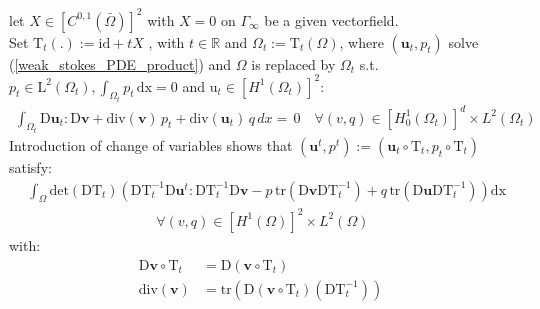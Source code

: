 \begin{theorem*}
let $X \in [C^{0,1}(\bar{\Omega})]^2$ with $X = 0$ on $\Gamma_{\infty}$ be a given vectorfield. \\
Set $\mathrm{T}_t(.) := \mathrm{id} + tX $ , with $t \in \mathbb{R}$ and $\Omega_t := \mathrm{T}_t(\Omega)$, where 
$(\mathbf{u}_t, p_t)$ solve (\ref{weak_stokes_PDE_product}) and $\Omega$ is replaced by $\Omega_t$ s.t. \\
$p_t \in \mathrm{L}^2(\Omega_t), \int_{\Omega_t} p_t \, \mathrm{dx} = 0 $ and $\mathrm{u}_t \in [H^1(\Omega_t)]^2:$ 
\begin{align}
	\int_{\Omega_t} \mathrm{D} \mathbf{u}_t : \mathrm{D} \mathbf{\mathbf{v}} + \mathrm{div}(\mathbf{v}) \, p_t + \mathrm{div}(\mathbf{u}_t) \, q \, dx = \, 0 \quad \forall (v,q)
    \in  [H^1_0(\Omega_t)]^d \times L^2(\Omega_t)
\end{align}
Introduction of change of variables shows that $(\mathbf{u}^t, p^t) := (\mathbf{u}_t \circ \mathrm{T}_t, p_t \circ \mathrm{T}_t)$ satisfy:
\begin{equation}
\begin{aligned}\label{trafo_weak_stokes}
	&\int_\Omega \mathrm{det}(\mathrm{DT}_t)
	\left( \mathrm{DT}_t^{-1} \mathrm{D}\mathbf{u}^t:\mathrm{DT}_t^{-1} \mathrm{D}\mathbf{v} -p\, \mathrm{tr}(\mathrm{D}\mathbf{v}\mathrm{DT}_t^{-1})  +
	q \, \mathrm{tr}(\mathrm{D}\mathbf{u}\mathrm{DT}_t^{-1}) \right) \mathrm{dx} \\
	& \quad \quad \quad \quad \quad \quad \quad \quad \quad \ \forall (v,q) \in [H^1(\Omega)]^2 \times L^2(\Omega)
\end{aligned}
\end{equation}
with:
\begin{align*}
	\mathrm{D}\mathbf{v}\circ\mathrm{T}_t &= \mathrm{D}(\mathbf{v}\circ\mathrm{T}_t) \\
	\mathrm{div}(\mathbf{v}) &= \mathrm{tr} \left( \mathrm{D}(\mathbf{v} \circ \mathrm{T}_t)(\mathrm{DT}_t^{-1}) \right)
\end{align*}

\vfill

\pagebreak


\end{theorem*}
